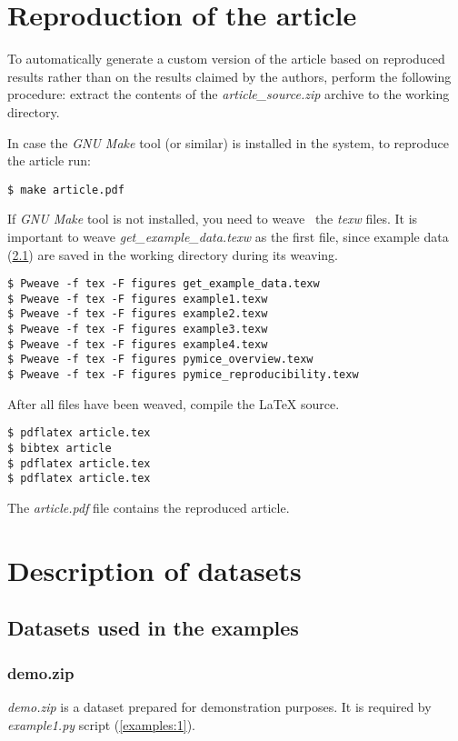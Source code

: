 \section{Reproduction of the article}
\label{reproduction}
To automatically generate a custom version of the article based on reproduced
results rather than on the results claimed by the authors, perform the following
procedure: extract the contents of the
\emph{article\_source.zip} archive to the working directory.

In case the \emph{GNU Make} tool (or similar) is installed in the system, to
reproduce the article run:
\begin{verbatim}
$ make article.pdf
\end{verbatim}

If \emph{GNU Make} tool is not installed, you need to weave~\cite{literateProgramming}
the \emph{texw} files.
It is important to weave \emph{get\_example\_data.texw} as the first file,
since example data (\ref{data:examples}) are saved in the working directory
during its weaving.

\begin{verbatim}
$ Pweave -f tex -F figures get_example_data.texw
$ Pweave -f tex -F figures example1.texw
$ Pweave -f tex -F figures example2.texw
$ Pweave -f tex -F figures example3.texw
$ Pweave -f tex -F figures example4.texw
$ Pweave -f tex -F figures pymice_overview.texw
$ Pweave -f tex -F figures pymice_reproducibility.texw
\end{verbatim}

After all files have been weaved, compile the \LaTeX{} source.

\begin{verbatim}
$ pdflatex article.tex
$ bibtex article
$ pdflatex article.tex
$ pdflatex article.tex
\end{verbatim}

The \emph{article.pdf} file contains the reproduced article.


\section{Description of datasets}
\subsection{Datasets used in the examples}
\label{data:examples}


\subsubsection{demo.zip}
\label{data:examples:demo}
\emph{demo.zip} is a dataset prepared for demonstration purposes.
It is required by \emph{example1.py} script (\ref{examples:1}).


